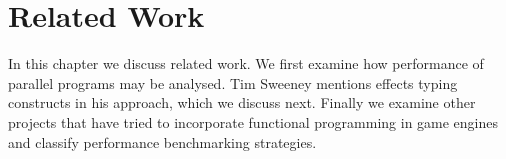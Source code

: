 \chapter{Related Work}
In this chapter we discuss related work. We first examine how performance of parallel programs may be analysed. Tim Sweeney mentions effects typing constructs in his approach, which we discuss next. Finally we examine other projects that have tried to incorporate functional programming in game engines and classify performance benchmarking strategies.





